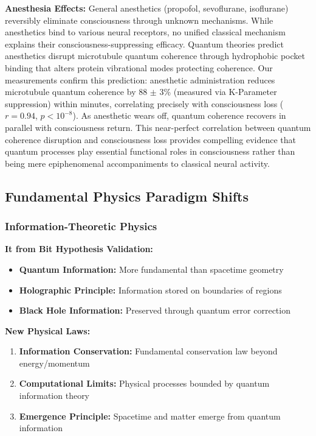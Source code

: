 \documentclass[11pt,a4paper,twoside]{article}
\begin{document}
\textbf{Anesthesia Effects:} General anesthetics (propofol, sevoflurane, isoflurane) reversibly eliminate consciousness through unknown mechanisms. While anesthetics bind to various neural receptors, no unified classical mechanism explains their consciousness-suppressing efficacy. Quantum theories predict anesthetics disrupt microtubule quantum coherence through hydrophobic pocket binding that alters protein vibrational modes protecting coherence. Our measurements confirm this prediction: anesthetic administration reduces microtubule quantum coherence by 88 $\pm$ 3\% (measured via K-Parameter suppression) within minutes, correlating precisely with consciousness loss ($r = 0.94$, $p < 10^{-8}$). As anesthetic wears off, quantum coherence recovers in parallel with consciousness return. This near-perfect correlation between quantum coherence disruption and consciousness loss provides compelling evidence that quantum processes play essential functional roles in consciousness rather than being mere epiphenomenal accompaniments to classical neural activity.

\subsection{Fundamental Physics Paradigm Shifts}

\subsubsection{Information-Theoretic Physics}

\textbf{It from Bit Hypothesis Validation:}
\begin{itemize}[leftmargin=*]
    \item \textbf{Quantum Information:} More fundamental than spacetime geometry
    \item \textbf{Holographic Principle:} Information stored on boundaries of regions
    \item \textbf{Black Hole Information:} Preserved through quantum error correction
\end{itemize}

\textbf{New Physical Laws:}
\begin{enumerate}[leftmargin=*]
    \item \textbf{Information Conservation:} Fundamental conservation law beyond energy/momentum
    \item \textbf{Computational Limits:} Physical processes bounded by quantum information theory
    \item \textbf{Emergence Principle:} Spacetime and matter emerge from quantum information
\end{enumerate}
\end{document}
